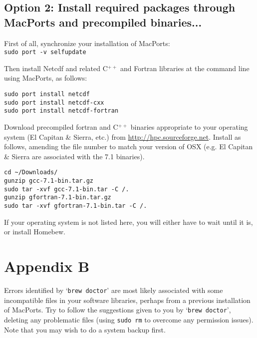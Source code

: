\documentclass[10pt,twoside]{article}
\begin{document}
\subsection*{Option 2: Install required packages through MacPorts and precompiled binaries...}

\begin{compactenum}

\item First of all, synchronize your installation of MacPorts:
\\\texttt{sudo port -v selfupdate} 

\item Then install Netcdf and related C\(^{++}\) and Fortran libraries at the command line using MacPorts, as follows:

\vspace{-5pt}\begin{verbatim}
sudo port install netcdf
sudo port install netcdf-cxx
sudo port install netcdf-fortran
\end{verbatim}

\item Download precompiled fortran and C\(^{++}\)  binaries appropriate to your operating system (El Capitan \& Sierra, etc.) from \href{http://hpc.sourceforge.net}{http://hpc.sourceforge.net}. Install as follows, amending the file number to match your version of OSX (e.g. El Capitan \& Sierra are associated with the 7.1 binaries).

\vspace{-5pt}\begin{verbatim}
cd ~/Downloads/
gunzip gcc-7.1-bin.tar.gz
sudo tar -xvf gcc-7.1-bin.tar -C /.
gunzip gfortran-7.1-bin.tar.gz 
sudo tar -xvf gfortran-7.1-bin.tar -C /.
\end{verbatim}

If your operating system is not listed here, you will either have to wait until it is, or install Homebew.

\end{compactenum}


\section*{Appendix B}

Errors identified by `\texttt{brew doctor}' are most likely associated with some incompatible files in your software libraries, perhaps from a previous installation of MacPorts. Try to follow the suggestions given to you by `\texttt{brew doctor}', deleting any problematic files (using \texttt{sudo rm} to overcome any permission issues). Note that you may wish to do a system backup first.

\end{document}
